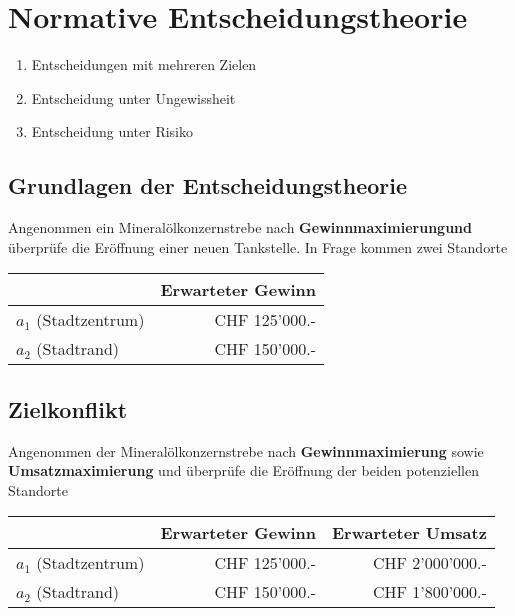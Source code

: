 \documentclass[
	final,
	a4paper,
	oneside,
	parskip=full,
	headings=standardclasses,
	headings=big,
	pointednumbers
]{scrartcl}
\newcommand{\txb}[1]{{\color{blue}#1}}
\newcommand{\tc}[1]{\multicolumn{1}{r|}{#1}}
\begin{document}
	
    \section*{Normative Entscheidungstheorie}


    \begin{enumerate}[label=$\bullet$]
        \setlength{\parskip}{1mm}
        \item Entscheidungen mit \txb{mehreren} Zielen
        \item Entscheidung unter \txb{Ungewissheit}
        \item Entscheidung unter \txb{Risiko}
    \end{enumerate}

	\subsection*{Grundlagen der Entscheidungstheorie}
        Angenommen ein Mineralölkonzernstrebe nach \textbf{Gewinnmaximierungund} überprüfe die
        Eröffnung einer neuen Tankstelle. In Frage kommen zwei Standorte

        \begin{tabular}{| l | l | }
            \hline
                                 & Erwarteter Gewinn \\ \hline
            $a_1$ (Stadtzentrum) & \tc{CHF 125’000.-} \\ \hline
            $a_2$ (Stadtrand)    & \tc{CHF 150’000.-} \\ \hline
        \end{tabular}

	\subsection*{Zielkonflikt}

        Angenommen der Mineralölkonzernstrebe nach \textbf{Gewinnmaximierung} sowie
        \textbf{Umsatzmaximierung} und
        überprüfe die Eröffnung der beiden potenziellen Standorte

        \begin{tabular}{| l | l | l |}
            \hline
                                 & Erwarteter Gewinn & Erwarteter Umsatz \\ \hline
            $a_1$ (Stadtzentrum) & \tc{CHF 125’000.-} & \tc{CHF 2’000’000.-} \\ \hline
            $a_2$ (Stadtrand)    & \tc{CHF 150’000.-} & \tc{CHF 1’800’000.-} \\ \hline
        \end{tabular}
\end{document}
